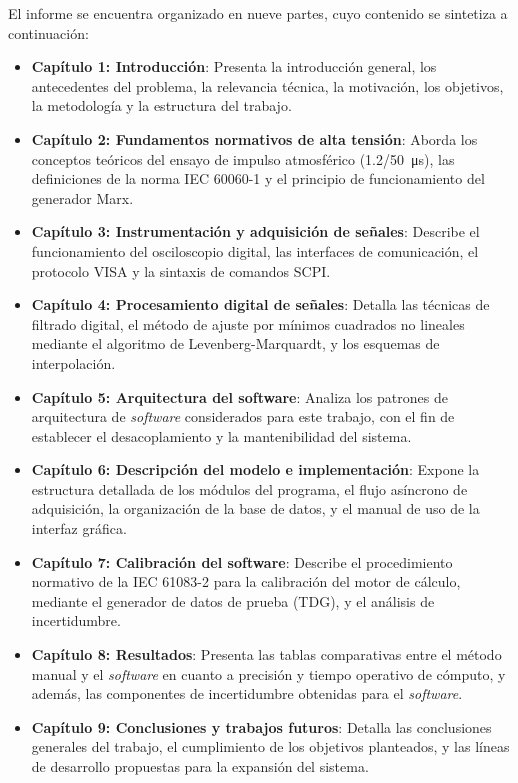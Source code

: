 El informe se encuentra organizado en nueve partes, cuyo contenido se sintetiza a continuación:

\begin{itemize}
    \item \textbf{Capítulo 1: Introducción}: Presenta la introducción general, los antecedentes del problema, la relevancia técnica, la motivación, los objetivos, la metodología y la estructura del trabajo.
    \item \textbf{Capítulo 2: Fundamentos normativos de alta tensión}: Aborda los conceptos teóricos del ensayo de impulso atmosférico (\qty[parse-numbers=false]{1.2/50}{\micro\second}), las definiciones de la norma IEC 60060-1 \cite{iec60060_1} y el principio de funcionamiento del generador Marx.
    \item \textbf{Capítulo 3: Instrumentación y adquisición de señales}: Describe el funcionamiento del osciloscopio digital, las interfaces de comunicación, el protocolo VISA y la sintaxis de comandos SCPI.
    \item \textbf{Capítulo 4: Procesamiento digital de señales}: Detalla las técnicas de filtrado digital, el método de ajuste por mínimos cuadrados no lineales mediante el algoritmo de Levenberg-Marquardt, y los esquemas de interpolación.
    \item \textbf{Capítulo 5: Arquitectura del software}: Analiza los patrones de arquitectura de \emph{software} considerados para este trabajo, con el fin de establecer el desacoplamiento y la mantenibilidad del sistema.
    \item \textbf{Capítulo 6: Descripción del modelo e implementación}: Expone la estructura detallada de los módulos del programa, el flujo asíncrono de adquisición, la organización de la base de datos, y el manual de uso de la interfaz gráfica.
    \item \textbf{Capítulo 7: Calibración del software}: Describe el procedimiento normativo de la IEC 61083-2 \cite{iec61083_2} para la calibración del motor de cálculo, mediante el generador de datos de prueba (TDG), y el análisis de incertidumbre.
    \item \textbf{Capítulo 8: Resultados}: Presenta las tablas comparativas entre el método manual y el \emph{software} en cuanto a precisión y tiempo operativo de cómputo, y además, las componentes de incertidumbre obtenidas para el \emph{software}.
    \item \textbf{Capítulo 9: Conclusiones y trabajos futuros}: Detalla las conclusiones generales del trabajo, el cumplimiento de los objetivos planteados, y las líneas de desarrollo propuestas para la expansión del sistema.
\end{itemize}
